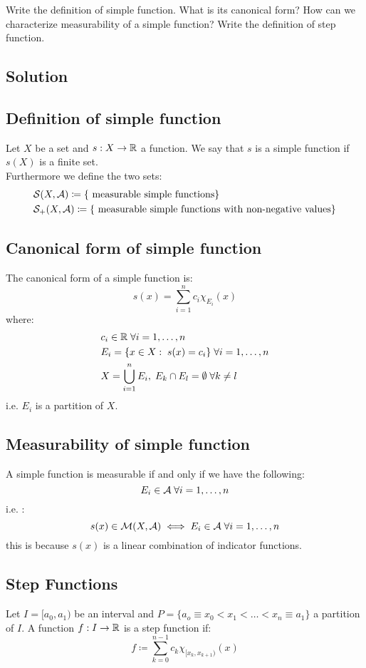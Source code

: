 

\question

Write the definition of simple function. What is its canonical form? How can we characterize measurability of a simple function? Write the definition of step function.

\subsection*{Solution}

\subsection{Definition of simple function}
Let $X$ be a set and $s:X\to\mathbb{R}$ a function. We say that $s$ is a simple function if $s(X)$ is a finite set. \\
Furthermore we define the two sets:
\begin{align*}
     & \mathcal{S}(X, \mathcal{A}) \coloneqq \{ \text{ measurable simple functions}  \}                           \\
     & \mathcal{S}_+(X, \mathcal{A}) \coloneqq \{ \text{ measurable simple functions with non-negative values} \}
\end{align*}

\subsection{Canonical form of simple function} \label{simple:canon}
The canonical form of a simple function is:
\[
    s(x) = \sum_{i=1}^n c_i \chi_{E_i}(x)
\]
where:
\begin{align*}
     & c_i \in \mathbb{R} \; \forall i=1,\dots,n                                      \\
     & E_i = \{ x\in X : \; s(x)=c_i \} \; \forall i=1,\dots,n                \\
     & X = \bigcup_{i=1}^n E_i, \; E_k\cap E_l = \emptyset \; \forall k\neq l
\end{align*}
i.e. $E_i$ is a partition of $X$.

\subsection{Measurability of simple function}
A simple function is measurable if and only if we have the following:
\[
    E_i \in \mathcal{A} \; \forall i=1,\dots,n
\]
i.e. :
\[
    s(x)\in \mathcal{M}(X,\mathcal{A}) \iff E_i \in \mathcal{A} \; \forall i=1,\dots,n
\]
this is because $s(x)$ is a linear combination of indicator functions.

\subsection{Step Functions}
Let $I=[a_0,a_1)$ be an interval and $P=\{ a_o \equiv x_0 < x_1 < \dots < x_n \equiv a_1 \}$ a partition of $I$. A function $f:I\to\mathbb{R}$ is a step function if:
\[
    f \coloneqq \sum_{k=0}^{n-1} c_k \chi_{[x_k,x_{k+1})} (x)
\]